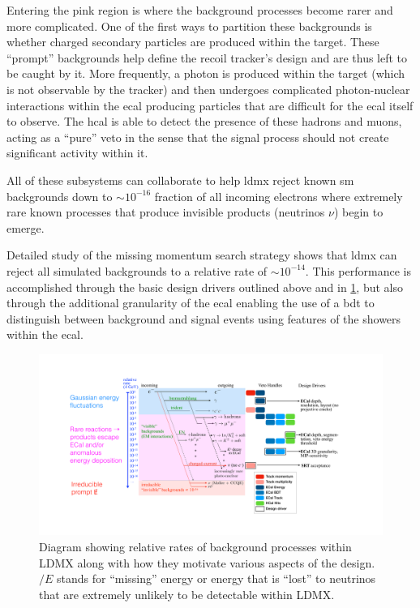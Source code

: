 Entering the pink region is where the background processes
become rarer and more complicated. One of the first ways to partition these backgrounds is
whether charged secondary particles are produced within the target. These ``prompt'' backgrounds
help define the recoil tracker's design and are thus left to be caught by it. More frequently,
a photon is produced within the target (which is not observable by the tracker) and then undergoes
complicated photon-nuclear interactions within the \ac{ecal} producing particles that are difficult
for the \ac{ecal} itself to observe. The \ac{hcal} is able to detect the presence of these hadrons
and muons, acting as a ``pure'' veto in the sense that the signal process should not create
significant activity within it.

All of these subsystems can collaborate to help \ac{ldmx} reject known \ac{sm} backgrounds
down to $\sim 10^{-16}$ fraction of all incoming electrons where extremely rare known processes
that produce invisible products (neutrinos $\nu$) begin to emerge.

Detailed study of the missing momentum search strategy\cite{ldmx-whitepaper,ldmx-photon-reject-2020,ldmx-8gev-2023} shows that \ac{ldmx} can reject all simulated backgrounds to a relative rate of $\sim 10^{-14}$.
This performance is accomplished through the basic design drivers outlined above and in \cref{fig:ldmx-bkgd-staircase}, but also through the additional granularity of the \ac{ecal} enabling
the use of a \ac{bdt} to distinguish between background and signal events using features of the
showers within the \ac{ecal}.

\begin{figure}
	\centering
	\includegraphics[width=\textwidth]{figures/ldmx/experiment/reaction_staircase_with_designDrivers.pdf}
	\caption{
		Diagram showing relative rates of background processes within LDMX along with
		how they motivate various aspects of the design. $\slash{E}$ stands for ``missing''
		energy or energy that is ``lost'' to neutrinos that are extremely unlikely to be
		detectable within LDMX.
	}
	\label{fig:ldmx-bkgd-staircase}
\end{figure}

